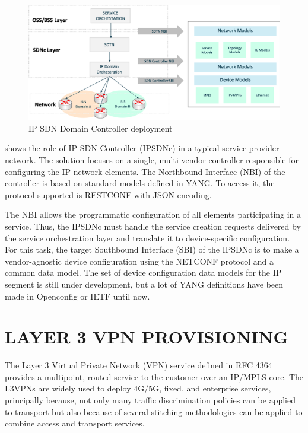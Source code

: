 \documentclass[conference]{IEEEtran}
\begin{document}
\begin{figure}
	\centering
		\includegraphics[width=\linewidth]{ifusion_multidomain_2.png}
	\caption{IP SDN Domain Controller deployment}
	\label{FIG:1}
\end{figure}


 shows the role of IP SDN Controller (IPSDNc) in a typical service provider network. The solution focuses on a single, multi-vendor controller responsible for configuring the IP network elements. The Northbound Interface (NBI) of the controller is based on standard models defined in YANG. To access it, the protocol supported is RESTCONF with JSON encoding.

The NBI allows the programmatic configuration of all elements participating in a service. Thus, the IPSDNc must handle the service creation requests delivered by the service orchestration layer and translate it to device-specific configuration. For this task, the target Southbound Interface (SBI) of the IPSDNc is to make a vendor-agnostic device configuration using the NETCONF protocol and a common data model. The set of device configuration data models for the IP segment is still under development, but a lot of YANG definitions have been made in Openconfig or IETF until now. 

\section{LAYER 3 VPN PROVISIONING}

The Layer 3 Virtual Private Network (VPN) service defined in RFC 4364 \cite{rosen2006rfc} provides a multipoint, routed service to the customer over an IP/MPLS core. The L3VPNs are widely used to deploy 4G/5G, fixed, and enterprise services, principally because, not only many traffic discrimination policies can be applied to transport but also because of several stitching methodologies can be applied to combine access and transport services. 
\end{document}

